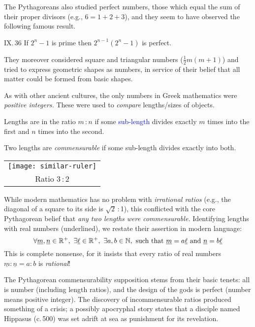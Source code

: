 The Pythagoreans also studied perfect numbers, those which equal the sum of their proper divisors (e.g., $6=1+2+3$), and they seem to have observed the following famous result.

\begin{thm*}{IX.\,36}{}
	If $2^n-1$ is prime then $2^{n-1}(2^n-1)$ is perfect.
\end{thm*}

They moreover considered square and triangular numbers ($\frac 12m(m+1)$) and tried to express geometric shapes as numbers, in service of their belief that all matter could be formed from basic shapes.

\vspace{-5pt}




As with other ancient cultures, the only numbers in Greek mathematics were \emph{positive integers.} These were used to \emph{compare} lengths/sizes of objects.

\begin{defn*}[lower separated=false, sidebyside, sidebyside align=top seam, sidebyside gap=0pt, righthand width=0.19\linewidth]{}{}
	Lengths are in the ratio $m$\,:\,$n$ if some \textcolor{blue}{sub-length} divides exactly $m$ times into the first and $n$ times into the second.\par
	Two lengths are \emph{commensurable} if some sub-length divides exactly into both.
	\tcblower
	\flushright
	\begin{tabular}{c@{}}
		\texttt{[image: similar-ruler]}\\
		Ratio 3\,:\,2
	\end{tabular}
\end{defn*}

While modern mathematics has no problem with \emph{irrational ratios} (e.g., the diagonal of a square to its side is $\sqrt 2$\,:\,1), this conflicted with the core Pythagorean belief that \emph{any two lengths were commensurable.} Identifying lengths with real numbers (underlined), we restate their assertion in modern language:
\[
	\forall \underline{m},\underline n\in\R^+,\ \exists \underline\ell\in\R^+,\ \exists a,b\in\N,\ \text{such that}\ \underline m=a\underline\ell\ \text{and}\ \underline n=b\underline\ell
\]
This is complete nonsense, for it insists that every ratio of real numbers $\underline m:\underline n=a:b$  is \emph{rational}!\smallbreak

The Pythagorean commensurability supposition stems from their basic tenets: all is number (including length ratios), and the design of the gods is perfect (number means positive integer). The discovery of incommensurable ratios produced something of a crisis; a possibly apocryphal story states that a disciple named Hippasus (c.\,500\BC) was set adrift at sea as punishment for its revelation.\smallbreak %

